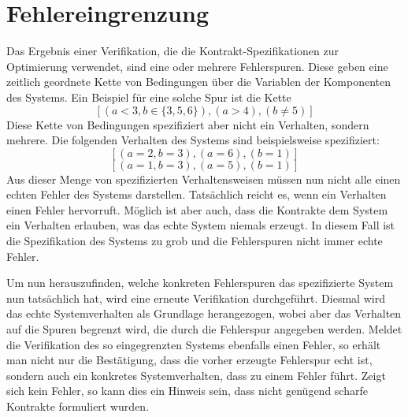 \section{Fehlereingrenzung}
\label{sec:error-refinement}
Das Ergebnis einer Verifikation, die die Kontrakt-Spezifikationen zur Optimierung verwendet, sind eine oder mehrere Fehlerspuren.
Diese geben eine zeitlich geordnete Kette von Bedingungen über die Variablen der Komponenten des Systems.
Ein Beispiel für eine solche Spur ist die Kette
\[ \left[ (a<3,b\in \{3,5,6\}), (a > 4), (b\neq 5) \right] \]
Diese Kette von Bedingungen spezifiziert aber nicht ein Verhalten, sondern mehrere.
Die folgenden Verhalten des Systems sind beispielsweise spezifiziert:
\[ \left[ (a=2,b=3), (a=6), (b = 1) \right] \]
\[ \left[ (a=1,b=3), (a=5), (b = 1) \right] \]
Aus dieser Menge von spezifizierten Verhaltensweisen müssen nun nicht alle einen echten Fehler des Systems darstellen.
Tatsächlich reicht es, wenn ein Verhalten einen Fehler hervorruft.
Möglich ist aber auch, dass die Kontrakte dem System ein Verhalten erlauben, was das echte System niemals erzeugt.
In diesem Fall ist die Spezifikation des Systems zu grob und die Fehlerspuren nicht immer echte Fehler.

Um nun herauszufinden, welche konkreten Fehlerspuren das spezifizierte System nun tatsächlich hat, wird eine erneute Verifikation durchgeführt.
Diesmal wird das echte Systemverhalten als Grundlage herangezogen, wobei aber das Verhalten auf die Spuren begrenzt wird, die durch die Fehlerspur angegeben werden.
Meldet die Verifikation des so eingegrenzten Systems ebenfalls einen Fehler, so erhält man nicht nur die Bestätigung, dass die vorher erzeugte Fehlerspur echt ist, sondern auch ein konkretes Systemverhalten, dass zu einem Fehler führt.
Zeigt sich kein Fehler, so kann dies ein Hinweis sein, dass nicht genügend scharfe Kontrakte formuliert wurden.

